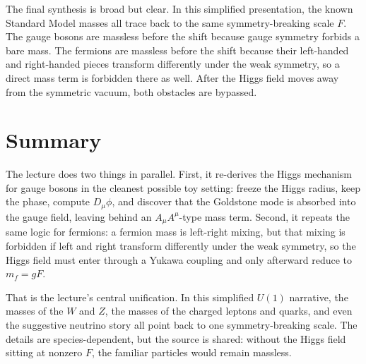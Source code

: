 The final synthesis is broad but clear. In this simplified presentation, the known Standard Model masses all trace back to the same symmetry-breaking scale \(F\). The gauge bosons are massless before the shift because gauge symmetry forbids a bare mass. The fermions are massless before the shift because their left-handed and right-handed pieces transform differently under the weak symmetry, so a direct mass term is forbidden there as well. After the Higgs field moves away from the symmetric vacuum, both obstacles are bypassed.

\section{Summary}

The lecture does two things in parallel. First, it re-derives the Higgs mechanism for gauge bosons in the cleanest possible toy setting: freeze the Higgs radius, keep the phase, compute \(D_\mu\phi\), and discover that the Goldstone mode is absorbed into the gauge field, leaving behind an \(A_\mu A^\mu\)-type mass term. Second, it repeats the same logic for fermions: a fermion mass is left-right mixing, but that mixing is forbidden if left and right transform differently under the weak symmetry, so the Higgs field must enter through a Yukawa coupling and only afterward reduce to \(m_f=gF\).

That is the lecture's central unification. In this simplified \(U(1)\) narrative, the masses of the \(W\) and \(Z\), the masses of the charged leptons and quarks, and even the suggestive neutrino story all point back to one symmetry-breaking scale. The details are species-dependent, but the source is shared: without the Higgs field sitting at nonzero \(F\), the familiar particles would remain massless.